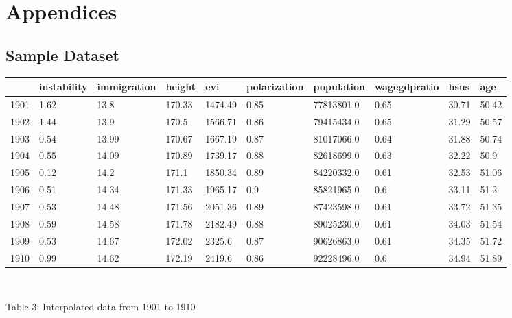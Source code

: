 \documentclass[twocolumn]{article}
\begin{document}
\newpage
\onecolumn
\section*{Appendices}
\begin{appendices}

\section{Sample Dataset}
    \begin{adjustbox}{angle=90, center}
    \begin{tabular}{llllllllll}
        \toprule
         & instability & immigration & height & evi & polarization & population & wagegdpratio & hsus & age \\
        \midrule
        1901 & 1.62 & 13.8 & 170.33 & 1474.49 & 0.85 & 77813801.0 & 0.65 & 30.71 & 50.42 \\
        1902 & 1.44 & 13.9 & 170.5 & 1566.71 & 0.86 & 79415434.0 & 0.65 & 31.29 & 50.57 \\
        1903 & 0.54 & 13.99 & 170.67 & 1667.19 & 0.87 & 81017066.0 & 0.64 & 31.88 & 50.74 \\
        1904 & 0.55 & 14.09 & 170.89 & 1739.17 & 0.88 & 82618699.0 & 0.63 & 32.22 & 50.9 \\
        1905 & 0.12 & 14.2 & 171.1 & 1850.34 & 0.89 & 84220332.0 & 0.61 & 32.53 & 51.06 \\
        1906 & 0.51 & 14.34 & 171.33 & 1965.17 & 0.9 & 85821965.0 & 0.6 & 33.11 & 51.2 \\
        1907 & 0.53 & 14.48 & 171.56 & 2051.36 & 0.89 & 87423598.0 & 0.61 & 33.72 & 51.35 \\
        1908 & 0.59 & 14.58 & 171.78 & 2182.49 & 0.88 & 89025230.0 & 0.61 & 34.03 & 51.54 \\
        1909 & 0.53 & 14.67 & 172.02 & 2325.6 & 0.87 & 90626863.0 & 0.61 & 34.35 & 51.72 \\
        1910 & 0.99 & 14.62 & 172.19 & 2419.6 & 0.86 & 92228496.0 & 0.6 & 34.94 & 51.89 \\
        \bottomrule 
    \end{tabular}\\
\end{adjustbox}
\begin{center}
Table 3: Interpolated data from 1901 to 1910
\end{center}
\newpage




\end{appendices}
\end{document}
